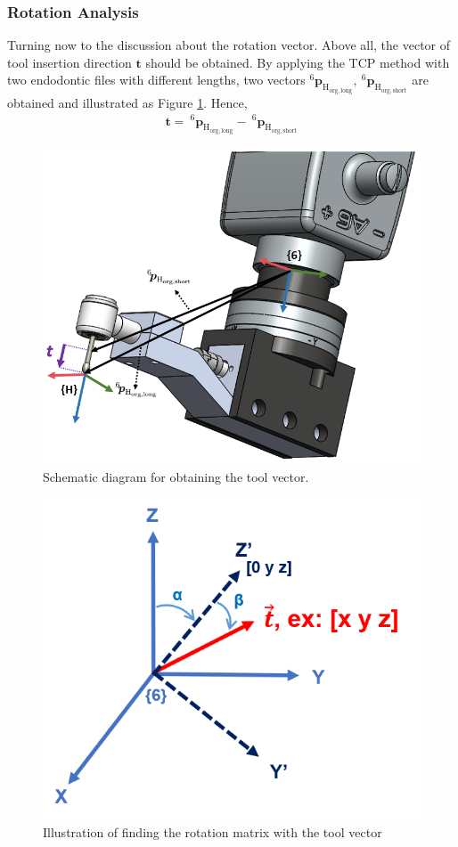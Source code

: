 \subsubsection{Rotation Analysis}
\label{sec:rot inf}
\hspace*{6mm}Turning now to the discussion about the rotation vector. Above all, the vector of tool insertion direction $\boldsymbol{t}$ should be obtained. By applying the TCP method with two endodontic files with different lengths, two vectors $^\mathrm{6}\!\boldsymbol{p}_\mathrm{H_{org,long}} ,\ ^\mathrm{6}\!\boldsymbol{p}_\mathrm{H_{org,short}}$ are obtained and illustrated as Figure \ref{fig:tcp2}. Hence, 
\begin{equation}
\begin{split}
\boldsymbol{t} =\ ^\mathrm{6}\!\boldsymbol{p}_\mathrm{H_{org,long}} -\ ^\mathrm{6}\!\boldsymbol{p}_\mathrm{H_{org,short}}
\end{split}
\end{equation}
\begin{figure}[htbp]
\begin{center}
\includegraphics[width=0.7\linewidth]{Images/TCP2.png}
\caption{ 
Schematic diagram for obtaining the tool vector. 
}\label{fig:tcp2}
\end{center}
\end{figure}
\begin{figure}[htbp]
\begin{center}
\includegraphics[width=0.6\linewidth]{Images/rot_inf.png}
\caption{
Illustration of finding the rotation matrix with the tool vector
}\label{fig:rot_inf}
\end{center}
\end{figure} 
